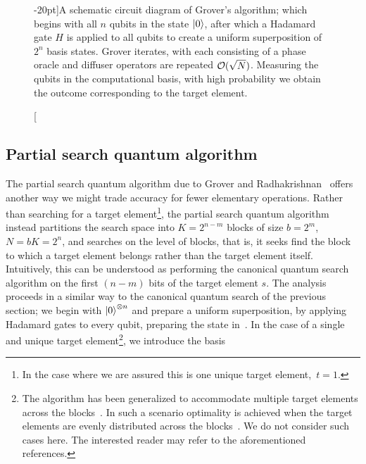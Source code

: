 \begin{figure}[h]
	\centering
	\caption[A schematic circuit diagram of Grover's algorithm.][-20pt]{A schematic circuit diagram of Grover's algorithm; which begins with all $n$ qubits in the state $\ket{0}$, after which a Hadamard gate $H$ is applied to all qubits to create a uniform superposition of $2^n$ basis states. Grover iterates, with each consisting of a phase oracle and diffuser operators are repeated $\mathcal{O}(\sqrt{N})$. Measuring the qubits in the computational basis, with high probability we obtain the outcome corresponding to the target element.} 
\end{figure}



\subsection{Partial search quantum algorithm}
The partial search quantum algorithm due to Grover and Radhakrishnan~\cite{Grover_2005} offers another way we might trade accuracy for fewer elementary operations. Rather than searching for a target element\footnote{In the case where we are assured this is one unique target element,~\ie ${t=1}$.}, the partial search quantum algorithm instead partitions the search space into $K=2^{n-m}$ blocks of size $b=2^m$,~\ie $N=bK=2^n$, and searches on the level of blocks, that is, it seeks find the block to which a target element belongs rather than the target element itself. Intuitively, this can be understood as performing the canonical quantum search algorithm on the first $(n-m)$ bits of the target element $s$. The analysis proceeds in a similar way to the canonical quantum search of the previous section; we begin with $\ket{0}^{\otimes n}$ and prepare a uniform superposition, by applying Hadamard gates to every qubit, preparing the state in~. In the case of a single and unique target element\footnote{The algorithm has been generalized to accommodate multiple target elements across the blocks~\cite{Choi_2007,Zhang_2018}. In such a scenario optimality is achieved when the target elements are evenly distributed across the blocks~\cite{Zhang_2018}. We do not consider such cases here. The interested reader may refer to the aforementioned references.}, we introduce the basis

